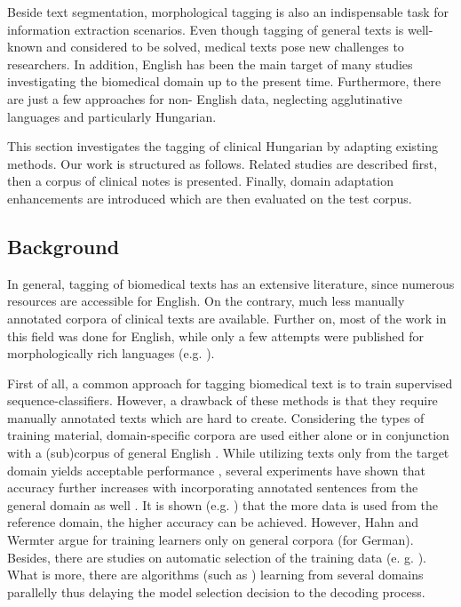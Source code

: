 Beside text segmentation, morphological tagging is also an indispensable task for information extraction scenarios. 
Even though tagging of general texts is well-known and considered to be solved, medical texts pose new challenges to researchers. 
In addition, English has been the main target of many studies investigating the biomedical domain up to the present time. 
Furthermore, there are just a few approaches for non- English data, neglecting agglutinative languages and particularly Hungarian.

This section investigates the tagging of clinical Hungarian by adapting existing methods. %
Our work is structured as follows. 
Related studies are described first, then a corpus of clinical notes is presented.
Finally, domain adaptation enhancements are introduced which are then evaluated on the test corpus.

\subsection{Background}
\label{sec:biomed_tag}

In general, tagging of biomedical texts has an extensive literature, since numerous resources are accessible for English. 
On the contrary, much less manually annotated corpora of clinical texts are available. 
Further on, most of the work in this field was done for English, while only a few attempts were published for morphologically rich languages (e.g. \cite{oleynik2009performance,rost2008lessons}).

First of all, a common approach for tagging biomedical text is to train supervised sequence-classifiers. 
However, a drawback of these methods is that they require manually annotated texts which are hard to create. %
Considering the types of training material, domain-specific corpora are used either alone \cite{pakhomov2006developing,Savova2010,Smith2006} or in conjunction with a (sub)corpus of general English \cite{coden2005domain,ferraro2013improving,miller2007building}. %
While utilizing texts only from the target domain yields acceptable performance \cite{pakhomov2006developing,Savova2010,Smith2006}, 
several experiments have shown that accuracy further increases with incorporating annotated sentences from the general domain as well \cite{barrett2011token,coden2005domain}. 
It is shown (e.g. \cite{pestian2004development}) that the more data is used from the reference domain, the higher accuracy can be achieved. 
However, Hahn and Wermter argue for training learners only on general corpora \cite{hahn2004tagging} (for German). 
Besides, there are studies on automatic selection of the training data (e. g. \cite{liu2007heuristic}). %
What is more, there are algorithms (such as \cite{choi2012fast}) learning from several domains parallelly thus delaying the model selection decision to the decoding process. 


